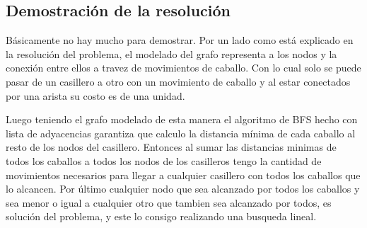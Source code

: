 \subsection{Demostraci\'on de la resoluci\'on}

B\'asicamente no hay mucho para demostrar. Por un lado como est\'a explicado en la resoluci\'on del problema, el modelado del grafo representa a los nodos y la conexi\'on entre ellos a travez de movimientos de caballo. Con lo cual solo se puede pasar de un casillero a otro con un movimiento de caballo y al estar conectados por una arista su costo es de una unidad.

Luego teniendo el grafo modelado de esta manera el algoritmo de BFS hecho con lista de adyacencias garantiza que calculo la distancia m\'inima de cada caballo al resto de los nodos del casillero. Entonces al sumar las distancias minimas de todos los caballos a todos los nodos de los casilleros tengo la cantidad de movimientos necesarios para llegar a cualquier casillero con todos los caballos que lo alcancen. Por \'ultimo cualquier nodo que sea alcanzado por todos los caballos y sea menor o igual a cualquier otro que tambien sea alcanzado por todos, es soluci\'on del problema, y este lo consigo realizando una busqueda lineal.